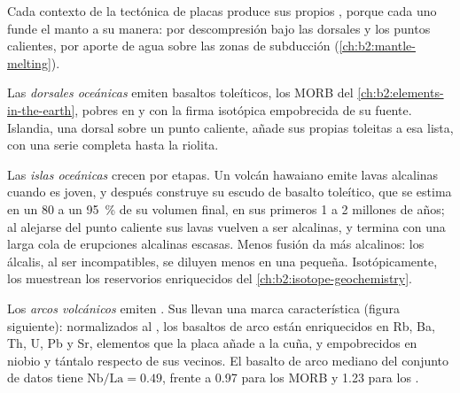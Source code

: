 Cada contexto de la tectónica de placas produce sus propios , porque cada uno funde el
manto a su manera: por descompresión bajo las dorsales y los puntos calientes, por aporte de agua
sobre las zonas de subducción (\cref{ch:b2:mantle-melting}).

Las \emph{dorsales oceánicas} emiten basaltos toleíticos, los MORB del
\cref{ch:b2:elements-in-the-earth}, pobres en  y con la
firma isotópica empobrecida de su fuente. Islandia, una dorsal sobre un punto caliente, añade
sus propias toleitas a esa lista, con una serie completa hasta la riolita.

Las \emph{islas oceánicas} crecen por etapas. Un volcán hawaiano emite lavas alcalinas cuando es
joven, y después construye su escudo de basalto toleítico, que se estima en un 80 a un
\qty{95}{\percent} de su volumen final, en sus primeros 1 a 2 millones de años; al
alejarse del punto caliente sus lavas vuelven a ser alcalinas, y termina con una larga cola de
erupciones alcalinas escasas. Menos fusión da  más alcalinos: los álcalis, al ser
incompatibles, se diluyen menos en una  pequeña. Isotópicamente, los  muestrean los reservorios enriquecidos del \cref{ch:b2:isotope-geochemistry}.

Los \emph{arcos volcánicos} emiten . Sus  llevan una
marca característica (figura siguiente): normalizados al , los basaltos de
arco están enriquecidos en Rb, Ba, Th, U, Pb y Sr, elementos que la placa añade a la
cuña, y empobrecidos en niobio y tántalo respecto de sus vecinos. El basalto de arco
mediano del conjunto de datos tiene $\mathrm{Nb}/\mathrm{La} = 0.49$, frente a 0.97 para los MORB
y 1.23 para los .

